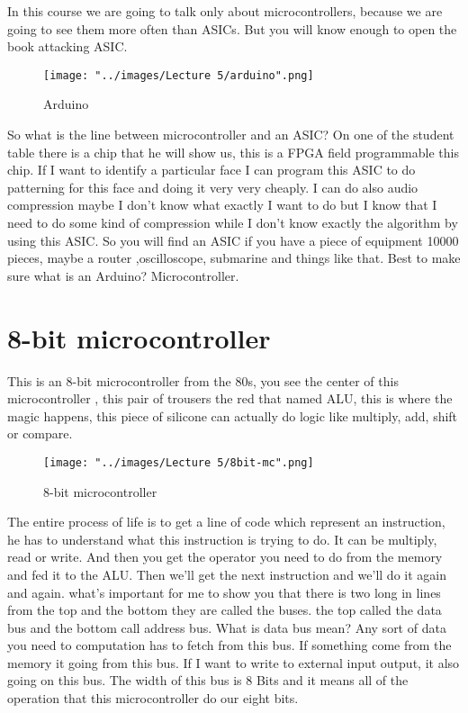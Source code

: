 \documentclass{report}
\begin{document}
In this course we are going to talk only about microcontrollers, because we are going to see them more often than ASICs. But you will know enough to open the book attacking ASIC.


\begin{figure}[htp]
\hspace*{+0.5in}
\texttt{[image: "../images/Lecture 5/arduino".png]}
\caption{Arduino}
\label{}
\end{figure}

So what is the line between microcontroller and an ASIC? On one of the student table there is a chip that he will show us, this is a FPGA field programmable this chip. If I want to identify a particular face I can program this ASIC to do patterning for this face and doing it very very cheaply. I can do also audio compression maybe I don't know what exactly I want to do but I know that I need to do some kind of compression while I don't know exactly the algorithm by using this ASIC. So you will find an ASIC if you have a piece of equipment 10000 pieces, maybe a router ,oscilloscope, submarine and things like that. Best to make sure what is an Arduino? Microcontroller. 


\section{8-bit microcontroller}

This is an 8-bit microcontroller from the 80s, you see the center of this microcontroller , this pair of trousers the red that named ALU, this is where the magic happens, this piece of silicone can actually do logic like multiply, add, shift or compare. 

\begin{figure}[htp]
\hspace*{-0.5in}
\texttt{[image: "../images/Lecture 5/8bit-mc".png]}
\caption{8-bit microcontroller}
\label{}
\end{figure}


The entire process of life is to get a line of code which represent an instruction, he has to understand what this instruction is trying to do. It can be multiply, read or write. And then you get the operator you need to do from the memory and fed it to the ALU. Then we'll get the next instruction and we'll do it again and again. what's important for me to show you that there is two long in lines from the top and the bottom they are called the buses. the top called the data bus and the bottom call address bus. What is data bus mean? Any sort of data you need to computation has to fetch from this bus. If something come from the memory it going from this bus. If I want to write to external input output, it also going on this bus. The width of this bus is 8 Bits and it means all of the operation that this microcontroller do our eight bits.
\end{document}
